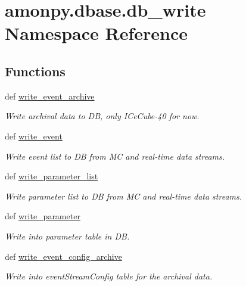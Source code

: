 \hypertarget{namespaceamonpy_1_1dbase_1_1db__write}{\section{amonpy.\-dbase.\-db\-\_\-write Namespace Reference}
\label{namespaceamonpy_1_1dbase_1_1db__write}
}
\subsection*{Functions}
\begin{DoxyCompactItemize}
\item 
def \hyperlink{namespaceamonpy_1_1dbase_1_1db__write_a2ae898f1bcfc667add03cbc4de70f645}{write\-\_\-event\-\_\-archive}
\begin{DoxyCompactList}\small\item\em Write archival data to D\-B, only I\-Ce\-Cube-\/40 for now. \end{DoxyCompactList}\item 
def \hyperlink{namespaceamonpy_1_1dbase_1_1db__write_a240b6dfa5edee5340624a13124963791}{write\-\_\-event}
\begin{DoxyCompactList}\small\item\em Write event list to D\-B from M\-C and real-\/time data streams. \end{DoxyCompactList}\item 
def \hyperlink{namespaceamonpy_1_1dbase_1_1db__write_ac3ac5b1f170cb930d0fb85677799d07d}{write\-\_\-parameter\-\_\-list}
\begin{DoxyCompactList}\small\item\em Write parameter list to D\-B from M\-C and real-\/time data streams. \end{DoxyCompactList}\item 
def \hyperlink{namespaceamonpy_1_1dbase_1_1db__write_ac21d31f2dcd5668ad24a18ebca62fd0e}{write\-\_\-parameter}
\begin{DoxyCompactList}\small\item\em Write into parameter table in D\-B. \end{DoxyCompactList}\item 
def \hyperlink{namespaceamonpy_1_1dbase_1_1db__write_aa57632ce1021c32f74bbb9c4ad4485ef}{write\-\_\-event\-\_\-config\-\_\-archive}
\begin{DoxyCompactList}\small\item\em Write into event\-Stream\-Config table for the archival data. \end{DoxyCompactList}\item 

\end{DoxyCompactItemize}
